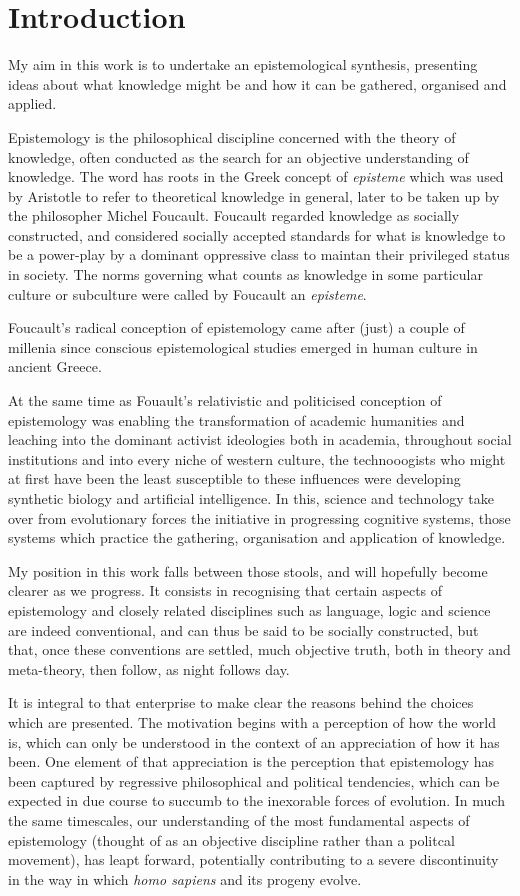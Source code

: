 \mainmatter
\chapter{Introduction}\label{chap:Introduction}

My aim in this work is to undertake an epistemological synthesis, presenting ideas about what knowledge might be and how it can be gathered, organised and applied.

Epistemology is the philosophical discipline concerned with the theory of knowledge, often conducted as the search for an objective understanding of knowledge.
The word has roots in the Greek concept of \emph{episteme} which was used by Aristotle to refer to theoretical knowledge in general, later to be taken up by the philosopher Michel Foucault.
Foucault regarded knowledge as socially constructed, and considered socially accepted standards for what is knowledge to be a power-play by a dominant oppressive class to maintan their privileged status in society.
The norms governing what counts as knowledge in some particular culture or subculture were called by Foucault an \emph{episteme}.

Foucault's radical conception of epistemology came after (just) a couple of millenia since conscious epistemological studies emerged in human culture in ancient Greece.

At the same time as Fouault's relativistic and politicised conception of epistemology was enabling the transformation of academic humanities and leaching into the dominant activist ideologies both in academia, throughout social institutions and into every niche of western culture, the technooogists who might at first have been the least susceptible to these influences were developing synthetic biology and artificial intelligence.
In this, science and technology take over from evolutionary forces the initiative in progressing cognitive systems, those systems which practice the gathering, organisation and application of knowledge.

My position in this work falls between those stools, and will hopefully become clearer as we progress.
It consists in recognising that certain aspects of epistemology and closely related disciplines such as language, logic and science are indeed conventional, and can thus be said to be socially constructed, but that, once these conventions are settled, much objective truth, both in theory and meta-theory, then follow, as night follows day.

It is integral to that enterprise to make clear the reasons behind the choices which are presented.
The motivation begins with a perception of how the world is, which can only be understood in the context of an appreciation of how it has been.
One element of that appreciation is the perception that epistemology has been captured by regressive philosophical and political tendencies, which can be expected in due course to succumb to the inexorable forces of evolution.
In much the same timescales, our understanding of the most fundamental aspects of epistemology (thought of as an objective discipline rather than a politcal movement), has leapt forward, potentially  contributing to a severe discontinuity in the way in which \emph{homo sapiens} and its progeny evolve.

